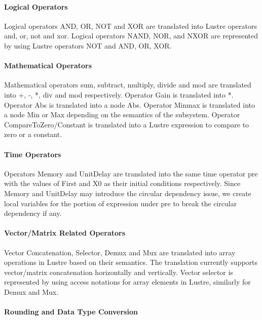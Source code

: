 \documentclass{article}
\begin{document}
\paragraph{Logical Operators} 
Logical operators \textsf{AND, OR, NOT} and \textsf{XOR} are translated into Lustre operators 
\textsf{and, or, not} and \textsf{xor}.
Logical operators \textsf{NAND, NOR}, and \textsf{NXOR} are represented by using Lustre 
operators \textsf{NOT} and \textsf{AND, OR, XOR}.

\paragraph{Mathematical Operators} 
Mathematical operators sum, subtract, multiply, divide and mod are translated into 
\textsf{+}, \textsf{-}, \textsf{*}, \textsf{div} and \textsf{mod} respectively.
Operator Gain is translated into \textsf{*}. 
Operator Abs is translated into a node Abs. 
Operator Minmax is translated into a node Min or Max depending on the semantics of the subsystem. 
Operator CompareToZero/Constant is translated into a Lustre expression to compare to zero or a constant. 

\paragraph{Time Operators}
Operators Memory and UnitDelay are translated into the same time operator \textsf{pre} with the 
values of First and X0 as their initial conditions respectively.
Since Memory and UnitDelay may introduce the circular dependency issue, we create local variables for the portion of expression under \textsf{pre} to break the circular dependency if any. 

\paragraph{Vector/Matrix Related Operators}
Vector Concatenation, Selector, Demux and Mux are translated into array operations in Lustre based on their semantics. 
The translation currently supports vector/matrix concatenation horizontally and vertically. 
Vector selector is represented by using access notations for array elements in Lustre, similarly for Demux and Mux. 

\paragraph{Rounding and Data Type Conversion}
\end{document}
